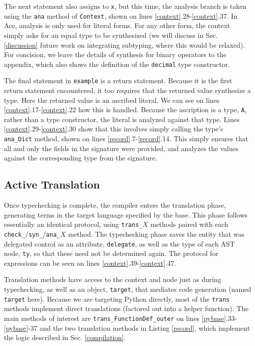 \documentclass[10pt,preprint]{sigplanconf}
\begin{document}
{The next statement also assigns to \verb|x|, but this time, the analysis branch is taken using the \verb|ana| method of \verb|Context|, shown on lines \ref{context}.28-\ref{context}.37. In Ace, analysis is only used for literal forms. For any other form, the context simply asks for an equal type to be synthesized (we will discuss in Sec. \ref{discussion} future work on integrating subtyping, where this would be relaxed). For concision, we leave the details of synthesis for binary operators to the appendix, which also shows the definition of the \verb|decimal| type constructor.

The final statement in \verb|example| is a return statement. Because it is the first return statement encountered, it too requires that the returned value synthesize a type. Here the returned value is an ascribed literal. We can see on lines \ref{context}.17-\ref{context}.22 how this is handled. Because the ascription is a type, \verb|A|, rather than a type constructor, the literal is analyzed against that type. Lines \ref{context}.29-\ref{context}.30 show that this involves simply calling the type's \verb|ana_Dict| method, shown on lines \ref{record}.7-\ref{record}.14. This simply ensures that all and only the fields in the signature were provided, and analyzes the values against the corresponding type from the signature. 

\subsection{Active Translation}
Once typechecking is complete, the compiler enters the translation phase, generating terms in the target language specified by the base. This phase follows essentially an identical protocol, using \verb|trans_|$X$ methods paired with each \verb|check_|/\verb|syn_|/\verb|ana_|$X$  method. The typechecking phase saves the entity that was delegated control as an attribute, \verb|delegate|, as well as the type of each AST node, \verb|ty|, so that these need not be determined again. The protocol for expressions can be seen on lines \ref{context}.39-\ref{context}.47.

Translation methods have access to the context and node just as during typechecking, as well as an object, \verb|target|, that mediates code generation (named \verb|target| here). Because we are targeting Python directly, most of the \verb|trans| methods implement direct translations (factored out into a helper function). The main methods of interest are \verb|trans_FunctionDef_outer| on lines \ref{pybase}.33-\ref{pybase}-37 and the two translation methods in Listing \ref{record}, which implement the logic described in Sec. \ref{compilation}. 

}
\end{document}
